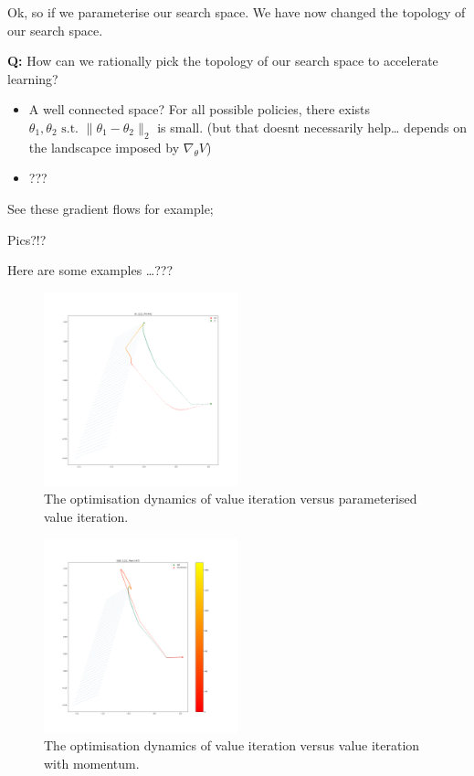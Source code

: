Ok, so if we parameterise our search space. We have now changed the
topology of our search space.

\textbf{Q:} How can we rationally pick the topology of our search space
to accelerate learning?

\begin{itemize}
\item
  A well connected space? For all possible policies, there exists
  \(\theta_1, \theta_2 \text{ s.t. } \parallel \theta_1- \theta_2\parallel_2\)
  is small. (but that doesnt necessarily help\ldots{} depends on the
  landscapce imposed by \(\nabla_{\theta} V\))
\item
  ???
\end{itemize}

See these gradient flows for example;

Pics?!?

Here are some examples \ldots{}???

\begin{figure}
\centering
\includegraphics[width=0.5\textwidth,height=0.5\textheight]{../../pictures/figures/vi-vs-pvi.png}
\caption{The optimisation dynamics of value iteration versus parameterised value iteration.}
\end{figure}

\begin{figure}
\centering
\includegraphics[width=0.5\textwidth,height=0.5\textheight]{../../pictures/figures/vi_sgd-vs-vi_mom.png}
\caption{The optimisation dynamics of value iteration versus value iteration with momentum.}
\end{figure}

